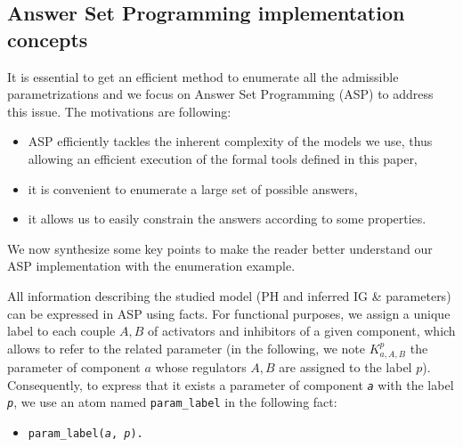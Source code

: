 \begin{comment}
\begin{definition}[Admissible parametrization \& Admissible parametrization with respect to inferred parameters]
\label{def:param_enum_inf}
Let $\PH = (\PHs, \PHl, \PHh)$ be a PH so that IG inference is possible, and $\IG = (\Gamma, E_+,
E_-)$ the inferred IG.
A parametrization $K$ on $\IG$ is said to be \emph{admissible} iff it respects
the extreme values assumption, the activity assumption and the monotonicity assumption.
A parametrization $K$ on $\IG$ is said to be \emph{admissible with respect to the
inferred parameters} iff it is admissible and that all parameters that can be inferred regarding
\pref{pps:param_K} are equal to their inferred value.
\end{definition}

\todo{utilité de “Admissible parametrization” seul ?}
\end{comment}


\subsection{Answer Set Programming implementation concepts}

\newcommand{\ti}[1]{\texttt{\textit{#1}}}
\newcommand{\aspil}[1]{\texttt{#1}}
\newcommand{\asp}[1]{\begin{itemize} \item[] \aspil{#1} \end{itemize}}

It is essential to get an efficient method to enumerate all the admissible parametrizations and
we focus on Answer Set Programming (ASP) \cite{Baral03} to address this issue. The motivations are following:
\begin{itemize}
  \item ASP efficiently tackles the inherent complexity of the models we use, thus allowing an efficient execution of the formal tools defined in this paper,
  \item it is convenient to enumerate a large set of possible answers,
  \item it allows us to easily constrain the answers according to some properties.
\end{itemize}
We now synthesize some key points to make the reader better understand our ASP implementation with the enumeration example.

All information describing the studied model (PH and inferred IG \& parameters) can be expressed in ASP using facts.
For functional purposes, we assign a unique label to each couple $A,B$ of activators and inhibitors of a given component, which allows to refer to the related parameter (in the following, we note $K^p_{a,A,B}$ the parameter of component $a$ whose regulators $A,B$ are assigned to the label $p$).
Consequently, to express that it exists a parameter of component \ti{a} with the label \ti{p}, we use an atom named \aspil{param\_label} in the following fact:
\asp{param\_label(\ti{a}, \ti{p}).}

